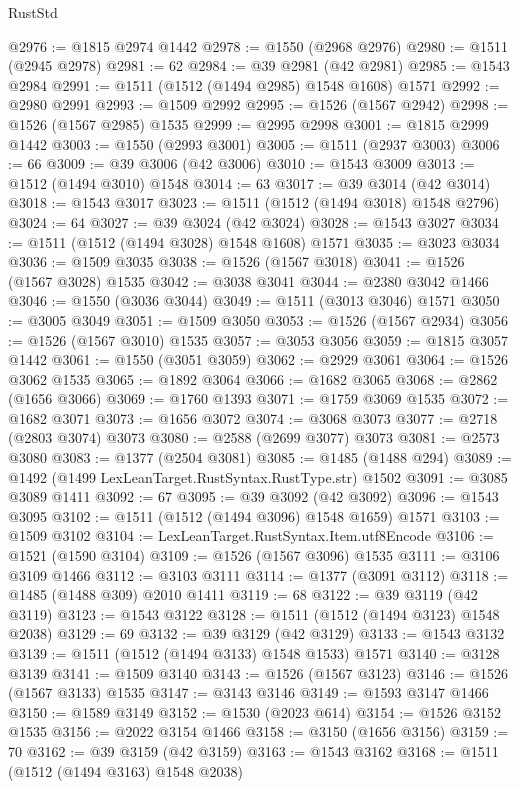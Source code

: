 \begin{lexlean}{RustStd}
\begin{coremodule}
{{@2976 := @1815 @2974 @1442
@2978 := @1550 (@2968 @2976)
@2980 := @1511 (@2945 @2978)
@2981 := 62
@2984 := @39 @2981 (@42 @2981)
@2985 := @1543 @2984
@2991 := @1511 (@1512 (@1494 @2985) @1548 @1608) @1571
@2992 := @2980 @2991
@2993 := @1509 @2992
@2995 := @1526 (@1567 @2942)
@2998 := @1526 (@1567 @2985) @1535
@2999 := @2995 @2998
@3001 := @1815 @2999 @1442
@3003 := @1550 (@2993 @3001)
@3005 := @1511 (@2937 @3003)
@3006 := 66
@3009 := @39 @3006 (@42 @3006)
@3010 := @1543 @3009
@3013 := @1512 (@1494 @3010) @1548
@3014 := 63
@3017 := @39 @3014 (@42 @3014)
@3018 := @1543 @3017
@3023 := @1511 (@1512 (@1494 @3018) @1548 @2796)
@3024 := 64
@3027 := @39 @3024 (@42 @3024)
@3028 := @1543 @3027
@3034 := @1511 (@1512 (@1494 @3028) @1548 @1608) @1571
@3035 := @3023 @3034
@3036 := @1509 @3035
@3038 := @1526 (@1567 @3018)
@3041 := @1526 (@1567 @3028) @1535
@3042 := @3038 @3041
@3044 := @2380 @3042 @1466
@3046 := @1550 (@3036 @3044)
@3049 := @1511 (@3013 @3046) @1571
@3050 := @3005 @3049
@3051 := @1509 @3050
@3053 := @1526 (@1567 @2934)
@3056 := @1526 (@1567 @3010) @1535
@3057 := @3053 @3056
@3059 := @1815 @3057 @1442
@3061 := @1550 (@3051 @3059)
@3062 := @2929 @3061
@3064 := @1526 @3062 @1535
@3065 := @1892 @3064
@3066 := @1682 @3065
@3068 := @2862 (@1656 @3066)
@3069 := @1760 @1393
@3071 := @1759 @3069 @1535
@3072 := @1682 @3071
@3073 := @1656 @3072
@3074 := @3068 @3073
@3077 := @2718 (@2803 @3074) @3073
@3080 := @2588 (@2699 @3077) @3073
@3081 := @2573 @3080
@3083 := @1377 (@2504 @3081)
@3085 := @1485 (@1488 @294)
@3089 := @1492 (@1499 LexLeanTarget.RustSyntax.RustType.str) @1502
@3091 := @3085 @3089 @1411
@3092 := 67
@3095 := @39 @3092 (@42 @3092)
@3096 := @1543 @3095
@3102 := @1511 (@1512 (@1494 @3096) @1548 @1659) @1571
@3103 := @1509 @3102
@3104 := LexLeanTarget.RustSyntax.Item.utf8Encode
@3106 := @1521 (@1590 @3104)
@3109 := @1526 (@1567 @3096) @1535
@3111 := @3106 @3109 @1466
@3112 := @3103 @3111
@3114 := @1377 (@3091 @3112)
@3118 := @1485 (@1488 @309) @2010 @1411
@3119 := 68
@3122 := @39 @3119 (@42 @3119)
@3123 := @1543 @3122
@3128 := @1511 (@1512 (@1494 @3123) @1548 @2038)
@3129 := 69
@3132 := @39 @3129 (@42 @3129)
@3133 := @1543 @3132
@3139 := @1511 (@1512 (@1494 @3133) @1548 @1533) @1571
@3140 := @3128 @3139
@3141 := @1509 @3140
@3143 := @1526 (@1567 @3123)
@3146 := @1526 (@1567 @3133) @1535
@3147 := @3143 @3146
@3149 := @1593 @3147 @1466
@3150 := @1589 @3149
@3152 := @1530 (@2023 @614)
@3154 := @1526 @3152 @1535
@3156 := @2022 @3154 @1466
@3158 := @3150 (@1656 @3156)
@3159 := 70
@3162 := @39 @3159 (@42 @3159)
@3163 := @1543 @3162
@3168 := @1511 (@1512 (@1494 @3163) @1548 @2038)
}}
\end{coremodule}
\end{lexlean}
